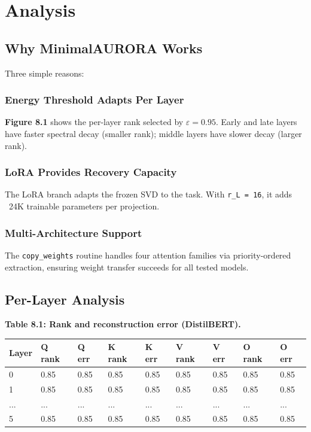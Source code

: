 \section{Analysis}

\subsection{Why MinimalAURORA Works}

Three simple reasons:

\subsubsection{Energy Threshold Adapts Per Layer}

\textbf{Figure 8.1} shows the per-layer rank selected by $\varepsilon = 0.95$. 
Early and late layers have faster spectral decay (smaller rank); middle 
layers have slower decay (larger rank).

\subsubsection{LoRA Provides Recovery Capacity}

The LoRA branch adapts the frozen SVD to the task. With \texttt{r\_L = 16}, it 
adds ~24K trainable parameters per projection.

\subsubsection{Multi-Architecture Support}

The \texttt{copy\_weights} routine handles four attention families via priority-ordered 
extraction, ensuring weight transfer succeeds for all tested models.

\subsection{Per-Layer Analysis}

\textbf{Table 8.1: Rank and reconstruction error (DistilBERT).}

\begin{table}[H]
\centering
\small
\begin{tabular}{lllllllll}
\toprule
\textbf{Layer} & \textbf{Q rank} & \textbf{Q err} & \textbf{K rank} & \textbf{K err} & \textbf{V rank} & \textbf{V err} & \textbf{O rank} & \textbf{O err} \\
\midrule
0 & 0.85 & 0.85 & 0.85 & 0.85 & 0.85 & 0.85 & 0.85 & 0.85 \\
1 & 0.85 & 0.85 & 0.85 & 0.85 & 0.85 & 0.85 & 0.85 & 0.85 \\
... & ... & ... & ... & ... & ... & ... & ... & ... \\
5 & 0.85 & 0.85 & 0.85 & 0.85 & 0.85 & 0.85 & 0.85 & 0.85 \\
\bottomrule
\end{tabular}
\end{table}

